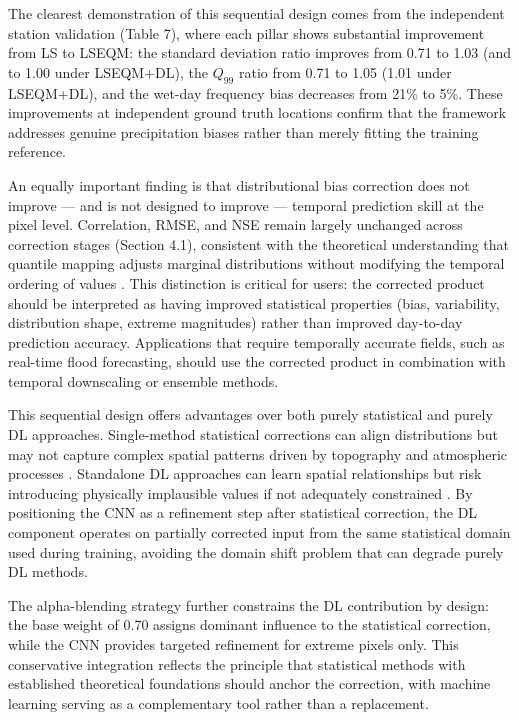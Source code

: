 \documentclass[11pt,a4paper]{article}
\begin{document}
The clearest demonstration of this sequential design comes from the
independent station validation (Table 7), where each pillar shows
substantial improvement from LS to LSEQM: the standard deviation ratio
improves from 0.71 to 1.03 (and to 1.00 under LSEQM+DL), the \(Q_{99}\)
ratio from 0.71 to 1.05 (1.01 under LSEQM+DL), and the wet-day frequency
bias decreases from 21\% to 5\%. These improvements at independent
ground truth locations confirm that the framework addresses genuine
precipitation biases rather than merely fitting the training reference.

An equally important finding is that distributional bias correction does
not improve --- and is not designed to improve --- temporal prediction
skill at the pixel level. Correlation, RMSE, and NSE remain largely
unchanged across correction stages (Section 4.1), consistent with the
theoretical understanding that quantile mapping adjusts marginal
distributions without modifying the temporal ordering of values
\cite{ref34}. This distinction is critical for users: the corrected product
should be interpreted as having improved statistical properties (bias,
variability, distribution shape, extreme magnitudes) rather than
improved day-to-day prediction accuracy. Applications that require
temporally accurate fields, such as real-time flood forecasting, should
use the corrected product in combination with temporal downscaling or
ensemble methods.

This sequential design offers advantages over both purely statistical
and purely DL approaches. Single-method statistical corrections can
align distributions but may not capture complex spatial patterns driven
by topography and atmospheric processes \cite{ref8,ref44}. Standalone DL
approaches can learn spatial relationships but risk introducing
physically implausible values if not adequately constrained \cite{ref9,ref12}.
By positioning the CNN as a refinement step after statistical
correction, the DL component operates on partially corrected input from
the same statistical domain used during training, avoiding the domain
shift problem that can degrade purely DL methods.

The alpha-blending strategy further constrains the DL contribution by
design: the base weight of 0.70 assigns dominant influence to the
statistical correction, while the CNN provides targeted refinement for
extreme pixels only. This conservative integration reflects the
principle that statistical methods with established theoretical
foundations should anchor the correction, with machine learning serving
as a complementary tool rather than a replacement.
\end{document}
